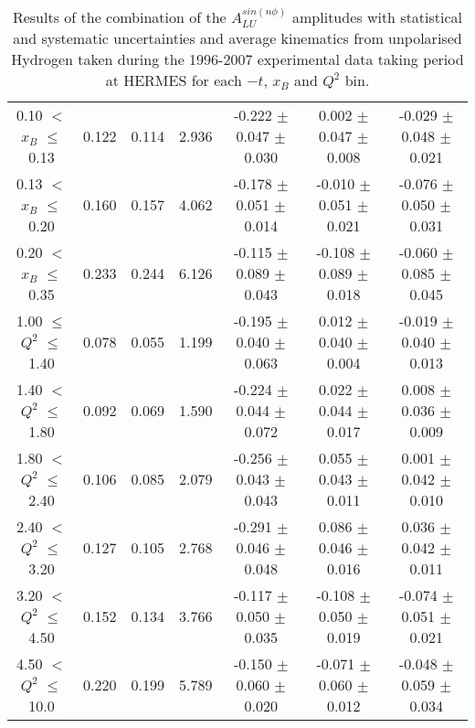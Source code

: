 {\begin{table}[width=15cm]
\begin{center}
{\begin{tabular}{|c|c|c|c|c|c|c|}
0.10 $<$ $x_{B}$ $\leqslant$ 0.13 &  0.122 &  0.114 &  2.936 &  -0.222 $\pm$   0.047  $\pm$   0.030 &
0.002  $\pm$  0.047 $\pm$    0.008 & -0.029 $\pm$ 0.048  $\pm$   0.021\\
0.13 $<$ $x_{B}$ $\leqslant$ 0.20 &  0.160 & 0.157 &  4.062 &  -0.178 $\pm$   0.051  $\pm$   0.014 &
-0.010  $\pm$  0.051 $\pm$    0.021 & -0.076 $\pm$   0.050  $\pm$   0.031\\
0.20 $<$ $x_{B}$ $\leqslant$ 0.35 &  0.233 & 0.244 &  6.126 &  -0.115  $\pm$  0.089 $\pm$    0.043 &
-0.108  $\pm$  0.089  $\pm$   0.018 & -0.060 $\pm$  0.085 $ \pm$  0.045\\
\hline
1.00 $\leqslant$ $Q^{2}$ $\leqslant$ 1.40 &  0.078 & 0.055  & 1.199  &  -0.195  $\pm$  0.040  $\pm$   0.063 &
0.012 $\pm$   0.040  $\pm$   0.004 & -0.019  $\pm$  0.040  $\pm$   0.013\\
1.40 $<$ $Q^{2}$ $\leqslant$ 1.80 &  0.092 & 0.069 &  1.590  &  -0.224  $\pm$  0.044  $\pm$   0.072 &
0.022 $\pm$  0.044  $\pm$   0.017 & 0.008 $\pm$   0.036  $\pm$   0.009\\
1.80 $<$ $Q^{2}$ $\leqslant$ 2.40 &  0.106 & 0.085 &  2.079  &  -0.256 $\pm$  0.043  $\pm$   0.043 &
0.055 $\pm$   0.043  $\pm$   0.011 & 0.001  $\pm$  0.042  $\pm$   0.010\\
2.40 $<$ $Q^{2}$ $\leqslant$ 3.20 &  0.127 & 0.105  & 2.768  &  -0.291  $\pm$  0.046   $\pm$  0.048 & 
0.086  $\pm$  0.046  $\pm$   0.016 & 0.036  $\pm$  0.042  $\pm$   0.011\\
3.20 $<$ $Q^{2}$ $\leqslant$ 4.50 &  0.152 & 0.134 &  3.766  &  -0.117  $\pm$  0.050  $\pm$   0.035 &
-0.108  $\pm$  0.050  $\pm$   0.019 & -0.074  $\pm$  0.051  $\pm$   0.021 \\
4.50 $<$ $Q^{2}$ $\leqslant$ 10.0 &  0.220 & 0.199 &  5.789  &  -0.150 $\pm$ 0.060  $\pm$   0.020 &
-0.071  $\pm$  0.060 $\pm$ 0.012 & -0.048  $\pm$  0.059  $\pm$  0.034\\
\hline
  \end{tabular}
}
 \end{center}
\caption{Results of the combination of the $A_{LU}^{sin(n\phi)}$ amplitudes with statistical and systematic uncertainties and average kinematics from unpolarised Hydrogen taken during
the 1996-2007 experimental data taking period at HERMES for each $-t$, $x_{B}$ and $Q^{2}$ bin.
}
\end{table}


}
